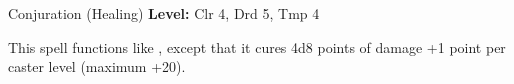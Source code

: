 {Conjuration (Healing)}
{
	\textbf{Level:}
	Clr 4, Drd 5, Tmp 4\\
}
{
	This spell functions like , except that it cures 4d8 points of damage +1 point per caster level (maximum +20).

}
